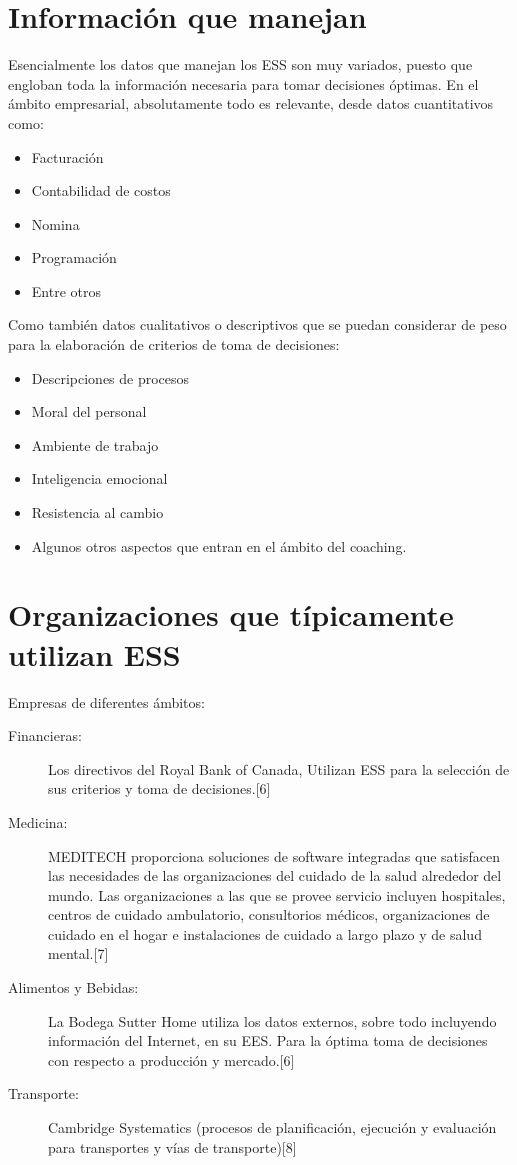 \section {Información que manejan}
Esencialmente los datos que manejan los ESS son muy variados, puesto que engloban toda la información necesaria para tomar decisiones óptimas. En el ámbito empresarial, absolutamente todo es relevante, desde datos cuantitativos como:

\begin{itemize}
\item Facturación
\item Contabilidad de costos
\item Nomina
\item Programación
\item Entre otros
\end{itemize}

Como también datos cualitativos o descriptivos que se puedan considerar de peso para la elaboración de criterios de toma de decisiones:

\begin{itemize}
\item Descripciones de procesos
\item Moral del personal
\item Ambiente de trabajo
\item Inteligencia emocional
\item Resistencia al cambio
\item Algunos otros aspectos que entran en el ámbito del coaching. 
\end{itemize}

\section {Organizaciones que típicamente utilizan ESS}
Empresas de diferentes ámbitos:
\begin{description}
\item [Financieras:] Los directivos del Royal Bank of Canada, Utilizan ESS para la selección de sus criterios y toma de decisiones.[6]
\item [Medicina:] MEDITECH proporciona soluciones de software integradas que satisfacen las necesidades de las organizaciones del cuidado de la salud alrededor del mundo. Las organizaciones a las que se provee servicio incluyen hospitales, centros de cuidado ambulatorio, consultorios médicos, organizaciones de cuidado en el hogar e instalaciones de cuidado a largo plazo y de salud mental.[7]
\item [Alimentos y Bebidas:] La Bodega Sutter Home utiliza los datos externos, sobre todo incluyendo información del Internet, en su EES. Para la óptima toma de decisiones con respecto a producción y mercado.[6]
\item [Transporte:] Cambridge Systematics (procesos de planificación, ejecución y evaluación para transportes y vías de transporte)[8]
\end{description}

